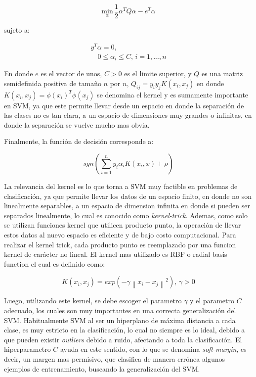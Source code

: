 $$ \underset{\alpha}{\mathrm{min}} \, \frac{1}{2} \alpha^{T} Q \alpha - e^{T} \alpha$$

sujeto a: 

\begin{align}
y^{T} \alpha = 0, \\
\quad 0\leq \alpha_{i} \leq C, \, i = 1, ..., n 
\end{align} 

En donde $e$ es el vector de unos, $ C > 0$ es el limite superior, y $ Q$ es una matriz semidefinida positiva de tamaño $ n$ por $ n$, $ Q_{ij} = y_{i} y_{j} K(x_{i}, x_{j})$ en donde $K(x_{i}, x_{j}) = \phi(x_{i})^{T} \phi(x_{j})$ se denomina el kernel y es sumamente importante en SVM, ya que este permite llevar desde un espacio en donde la separación de las clases no es tan clara, a un espacio de dimensiones muy grandes o infinitas, en donde la separación se vuelve mucho mas obvia.

Finalmente, la función de decisión corresponde a:

$$ sgn(\sum_{i=1}^{n}y_{i} \alpha_{i}K(x_{i}, x) + \rho)$$ 

La relevancia del kernel es lo que torna a SVM muy factible en problemas de clasificación, ya que permite llevar los datos de un espacio finito, en donde no son linealmente separables, a un espacio de dimension infinita en donde si pueden ser separados linealmente, lo cual es conocido como \textit{kernel-trick}. Ademas, como solo se utilizan funciones kernel que utilicen producto punto, la operación de llevar estos datos al nuevo espacio es eficiente y de bajo costo computacional. Para realizar el kernel trick, cada producto punto es reemplazado por una funcion kernel de carácter no lineal. El kernel mas utilizado es RBF o radial basis function el cual es definido como:

$$ K(x_{i}, x_{j}) = exp(- \gamma \left\|{ x_{i} - x_{j}}\right\|^2) , \, \gamma > 0$$

Luego, utilizando este kernel, se debe escoger el parametro $\gamma$ y el parametro $ C$ adecuado, los cuales son muy importantes en una correcta generalización del SVM. Habitualmente SVM al ser un hiperplano de máxima distancia a cada clase, es muy estricto en la clasificación, lo cual no siempre es lo ideal, debido a que pueden existir \textit{outliers} debido a ruido, afectando a toda la clasificación. El hiperparametro $C$ ayuda en este sentido, con lo que se denomina \textit{soft-margin}, es decir, un margen mas permisivo, que clasifica de manera errónea algunos ejemplos de entrenamiento, buscando la generalización del SVM.

